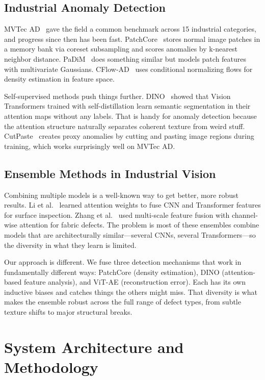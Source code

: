 \documentclass[journal]{IEEEtran}
\begin{document}
\subsection{Industrial Anomaly Detection}

MVTec AD~\cite{bergmann2019mvtec} gave the field a common benchmark across 15 industrial categories, and progress since then has been fast. PatchCore~\cite{roth2022patchcore} stores normal image patches in a memory bank via coreset subsampling and scores anomalies by k-nearest neighbor distance. PaDiM~\cite{defard2021padim} does something similar but models patch features with multivariate Gaussians. CFlow-AD~\cite{yu2021cflow} uses conditional normalizing flows for density estimation in feature space.

Self-supervised methods push things further. DINO~\cite{caron2021emerging} showed that Vision Transformers trained with self-distillation learn semantic segmentation in their attention maps without any labels. That is handy for anomaly detection because the attention structure naturally separates coherent texture from weird stuff. CutPaste~\cite{li2021cutpaste} creates proxy anomalies by cutting and pasting image regions during training, which works surprisingly well on MVTec AD.

\subsection{Ensemble Methods in Industrial Vision}

Combining multiple models is a well-known way to get better, more robust results. Li et al.~\cite{li2022ensemble} learned attention weights to fuse CNN and Transformer features for surface inspection. Zhang et al.~\cite{zhang2023multiscale} used multi-scale feature fusion with channel-wise attention for fabric defects. The problem is most of these ensembles combine models that are architecturally similar---several CNNs, several Transformers---so the diversity in what they learn is limited.

Our approach is different. We fuse three detection mechanisms that work in fundamentally different ways: PatchCore (density estimation), DINO (attention-based feature analysis), and ViT-AE (reconstruction error). Each has its own inductive biases and catches things the others might miss. That diversity is what makes the ensemble robust across the full range of defect types, from subtle texture shifts to major structural breaks.

\section{System Architecture and Methodology}
\label{sec:method}
\end{document}
